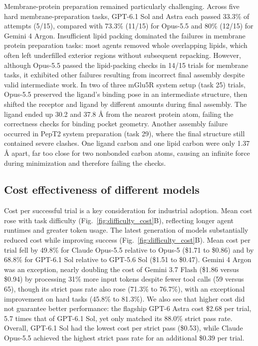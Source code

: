Membrane-protein preparation remained particularly challenging. Across five hard membrane-preparation tasks, GPT-6.1 Sol and Astra each passed 33.3\% of attempts (5/15), compared with 73.3\% (11/15) for Opus-5.5 and 80\% (12/15) for Gemini 4 Argon. Insufficient lipid packing dominated the failures in membrane protein preparation tasks: most agents removed whole overlapping lipids, which often left underfilled exterior regions without subsequent repacking. However, although Opus-5.5 passed the lipid-packing checks in 14/15 trials for membrane tasks, it exhibited other failures resulting from incorrect final assembly despite valid intermediate work. In two of three mGlu5R system setup (task 25) trials, Opus-5.5 preserved the ligand’s binding pose in an intermediate structure, then shifted the receptor and ligand by different amounts during final assembly. The ligand ended up 30.2 and 37.8 Å from the nearest protein atom, failing the correctness checks for binding pocket geometry. Another assembly failure occurred in PepT2 system preparation (task 29), where the final structure still contained severe clashes. One ligand carbon and one lipid carbon were only 1.37 Å apart, far too close for two nonbonded carbon atoms, causing an infinite force during minimization and therefore failing the checks.



\subsection{Cost effectiveness of different models}

Cost per successful trial is a key consideration for industrial adoption. Mean cost rose with task difficulty (Fig.~\ref{fig:difficulty_cost}B), reflecting longer agent runtimes and greater token usage. The latest generation of models substantially reduced cost while improving success (Fig.~\ref{fig:difficulty_cost}B). Mean cost per trial fell by 49.8\% for Claude Opus-5.5 relative to Opus-5 (\$1.71 to \$0.86) and by 68.8\% for GPT-6.1 Sol relative to GPT-5.6 Sol (\$1.51 to \$0.47). Gemini 4 Argon was an exception, nearly doubling the cost of Gemini 3.7 Flash (\$1.86 versus \$0.94) by processing 31\% more input tokens despite fewer tool calls (59 versus 65), though its strict pass rate also rose (71.3\% to 76.7\%), with an exceptional improvement on hard tasks (45.8\% to 81.3\%). We also see that higher cost did not guarantee better performance: the flagship GPT-6 Astra cost \$2.68 per trial, 5.7 times that of GPT-6.1 Sol, yet only matched its 88.0\% strict pass rate. Overall, GPT-6.1 Sol had the lowest cost per strict pass (\$0.53), while Claude Opus-5.5 achieved the highest strict pass rate for an additional \$0.39 per trial.



